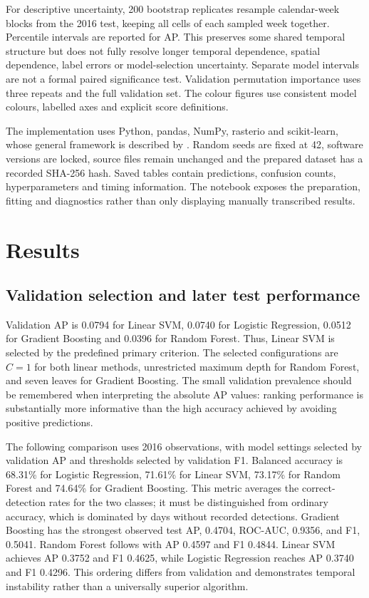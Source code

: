 \documentclass[conference,a4paper]{IEEEtran}
\begin{document}
For descriptive uncertainty, 200 bootstrap replicates resample calendar-week blocks from the 2016 test, keeping all cells of each sampled week together. Percentile intervals are reported for AP. This preserves some shared temporal structure but does not fully resolve longer temporal dependence, spatial dependence, label errors or model-selection uncertainty. Separate model intervals are not a formal paired significance test. Validation permutation importance uses three repeats and the full validation set. The colour figures use consistent model colours, labelled axes and explicit score definitions.

The implementation uses Python, pandas, NumPy, rasterio and scikit-learn, whose general framework is described by \citet{pedregosa}. Random seeds are fixed at 42, software versions are locked, source files remain unchanged and the prepared dataset has a recorded SHA-256 hash. Saved tables contain predictions, confusion counts, hyperparameters and timing information. The notebook exposes the preparation, fitting and diagnostics rather than only displaying manually transcribed results.

\section{Results}
\subsection{Validation selection and later test performance}
Validation AP is 0.0794 for Linear SVM, 0.0740 for Logistic Regression, 0.0512 for Gradient Boosting and 0.0396 for Random Forest. Thus, Linear SVM is selected by the predefined primary criterion. The selected configurations are $C=1$ for both linear methods, unrestricted maximum depth for Random Forest, and seven leaves for Gradient Boosting. The small validation prevalence should be remembered when interpreting the absolute AP values: ranking performance is substantially more informative than the high accuracy achieved by avoiding positive predictions.

The following comparison uses 2016 observations, with model settings selected by validation AP and thresholds selected by validation F1. Balanced accuracy is 68.31\% for Logistic Regression, 71.61\% for Linear SVM, 73.17\% for Random Forest and 74.64\% for Gradient Boosting. This metric averages the correct-detection rates for the two classes; it must be distinguished from ordinary accuracy, which is dominated by days without recorded detections. Gradient Boosting has the strongest observed test AP, 0.4704, ROC-AUC, 0.9356, and F1, 0.5041. Random Forest follows with AP 0.4597 and F1 0.4844. Linear SVM achieves AP 0.3752 and F1 0.4625, while Logistic Regression reaches AP 0.3740 and F1 0.4296. This ordering differs from validation and demonstrates temporal instability rather than a universally superior algorithm.
\end{document}
